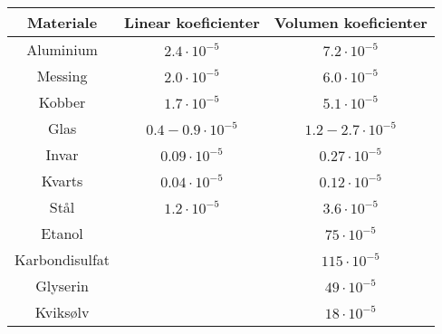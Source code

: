 \begin{tabular}{|c|c|c|}
	\hline
	Materiale&Linear koeficienter&Volumen koeficienter\\
	\hline
	Aluminium&$2.4\cdot 10^{-5}$&$7.2\cdot 10^{-5}$\\
	Messing&$2.0\cdot 10^{-5}$&$6.0\cdot 10^{-5}$\\
	Kobber&$1.7\cdot 10^{-5}$&$5.1\cdot 10^{-5}$\\
	Glas&$0.4-0.9\cdot 10^{-5}$&$1.2-2.7\cdot 10^{-5}$\\
	Invar&$0.09\cdot 10^{-5}$&$0.27\cdot 10^{-5}$\\
	Kvarts&$0.04\cdot 10^{-5}$&$0.12\cdot 10^{-5}$\\
	Stål&$1.2\cdot 10^{-5}$&$3.6\cdot 10^{-5}$\\
	Etanol&&$75\cdot 10^{-5}$\\
	Karbondisulfat&&$115\cdot 10^{-5}$\\
	Glyserin&&$49\cdot 10^{-5}$\\
	Kviksølv&&$18\cdot 10^{-5}$\\
	\hline
\end{tabular}